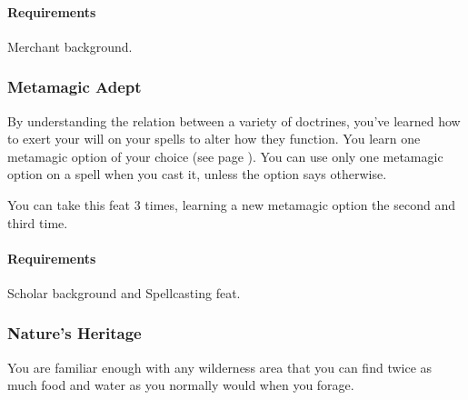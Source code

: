     \paragraph{Requirements} Merchant background.
\subsubsection{Metamagic Adept} \label{feat::metamagicadept}
    By understanding the relation between a variety of doctrines, you've learned how to exert your will on your spells to alter how they function.
    You learn one metamagic option of your choice (see page \pageref{ssec::metamagic}).
    You can use only one metamagic option on a spell when you cast it, unless the option says otherwise.

    You can take this feat 3 times, learning a new metamagic option the second and third time.
    \paragraph{Requirements} Scholar background and Spellcasting feat.
\subsubsection{Nature's Heritage} \label{feat::naturesheritage}
    You are familiar enough with any wilderness area that you can find twice as much food and water as you normally would when you forage.
